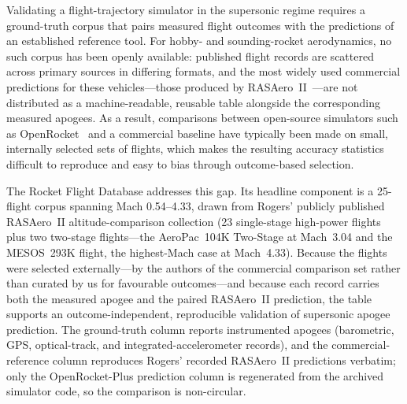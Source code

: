 
Validating a flight-trajectory simulator in the supersonic regime requires a
ground-truth corpus that pairs measured flight outcomes with the predictions of
an established reference tool. For hobby- and sounding-rocket aerodynamics, no
such corpus has been openly available: published flight records are scattered
across primary sources in differing formats, and the most widely used commercial
predictions for these vehicles---those produced by RASAero~II~\cite{rogers2015}---are
not distributed as a machine-readable, reusable table alongside the corresponding
measured apogees. As a result, comparisons between open-source simulators such as
OpenRocket~\cite{niskanen2009} and a commercial baseline have typically been made
on small, internally selected sets of flights, which makes the resulting accuracy
statistics difficult to reproduce and easy to bias through outcome-based selection.

The Rocket Flight Database addresses this gap. Its headline component is a
25-flight corpus spanning Mach 0.54--4.33, drawn from Rogers' publicly published
RASAero~II altitude-comparison collection (23 single-stage high-power flights plus
two two-stage flights---the AeroPac~104K Two-Stage at Mach~3.04 and the MESOS~293K
flight, the highest-Mach case at Mach~4.33). Because the
flights were selected externally---by the authors of the commercial comparison set
rather than curated by us for favourable outcomes---and because each record carries
both the measured apogee and the paired RASAero~II prediction, the table supports an
outcome-independent, reproducible validation of supersonic apogee prediction. The
ground-truth column reports instrumented apogees (barometric, GPS, optical-track,
and integrated-accelerometer records), and the commercial-reference column reproduces
Rogers' recorded RASAero~II predictions verbatim; only the OpenRocket-Plus prediction
column is regenerated from the archived simulator code, so the comparison is
non-circular.

